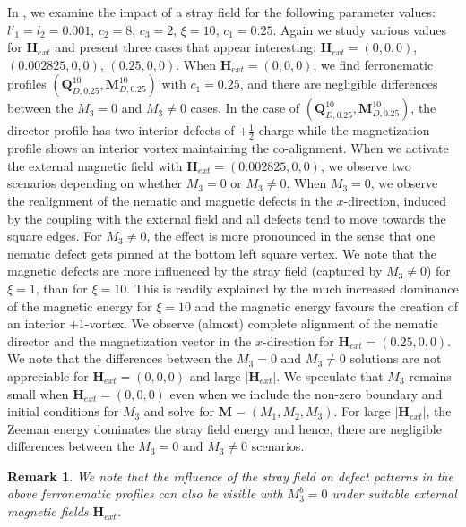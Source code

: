 \documentclass{article}
\newtheorem{remark}[theorem]{Remark}
\def\Qvec{\mathbf{Q}}
\def \Mvec{\mathbf{M}}
\def\Hvec{\mathbf{H}}
\begin{document}
In , we examine the impact of a stray field for the following parameter values: $l'_1=l_2=0.001$, $c_2=8$, $c_3=2$, $\xi=10$, $c_1=0.25$. 
Again we study various values for $\Hvec_{ext}$ and present three cases that appear interesting: $\Hvec_{ext}=\left(0,0,0\right)$, $\left(0.002825, 0, 0\right)$, $\left(0.25, 0, 0\right)$. When $\Hvec_{ext}=\left(0, 0, 0\right)$, we find ferronematic profiles $\left(\Qvec^{10}_{D, 0.25}, \Mvec^{10}_{D, 0.25}\right)$ with $c_1=0.25$, and there are negligible differences between the $M_3=0$ and $M_3 \neq 0$ cases. In the case of $\left(\Qvec^{10}_{D, 0.25}, \Mvec^{10}_{D, 0.25}\right)$, the director profile has two interior defects of $+\frac{1}{2}$ charge while the magnetization profile shows an interior vortex maintaining the co-alignment. When we activate the external magnetic field with $\Hvec_{ext}=\left(0.002825, 0, 0\right)$, we observe two scenarios depending on whether $M_3=0$ or $M_3\ne 0$. When $M_3=0$, we observe the realignment of the nematic and magnetic defects in the $x$-direction, induced by the coupling with the external field and all defects tend to move towards the square edges. For $M_3 \neq 0$, the effect is more pronounced in the sense that one nematic defect gets pinned at the bottom left square vertex. We note that the magnetic defects are more influenced by the stray field (captured by $M_3 \neq 0$) for $\xi=1$, than for $\xi=10$. This is readily explained by the much increased dominance of the magnetic energy for $\xi=10$ and the magnetic energy favours the creation of an interior $+1$-vortex.  We observe (almost) complete alignment of the nematic director and the magnetization vector in the $x$-direction for $\Hvec_{ext}=\left(0.25, 0, 0\right)$. We note that the differences between the $M_3=0$ and $M_3 \neq 0$ solutions are not appreciable for $\Hvec_{ext} = (0,0,0)$ and large $|\Hvec_{ext}|$. We speculate that $M_3$ remains small when $\Hvec_{ext} = (0,0,0)$ even when we include the non-zero boundary and initial conditions for $M_3$ and solve for $\Mvec = (M_1, M_2, M_3)$. For large $|\Hvec_{ext}|$, the Zeeman energy dominates the stray field energy and hence, there are negligible differences between the $M_3=0$ and $M_3 \neq 0$ scenarios. 

\begin{remark}
We note that the influence of the stray field on defect patterns in the above ferronematic profiles can also be visible with $M_3^b=0$ under suitable external magnetic fields $\Hvec_{ext}$.
\end{remark}
\end{document}
